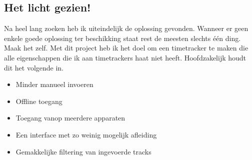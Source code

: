 \documentclass[a4paper,11pt]{article}
\begin{document}
\subsection{Het licht gezien!}
Na heel lang zoeken heb ik uiteindelijk de oplossing gevonden. Wanneer er geen
enkele goede oplossing ter beschikking staat rest de meesten slechts één ding.
Maak het zelf. Met dit project heb ik het doel om een timetracker te maken die
alle eigenschappen die ik aan timetrackers haat niet heeft. Hoofdzakelijk houdt
dit het volgende in.
\begin{itemize}
  \item Minder manueel invoeren
  \item Offline toegang
  \item Toegang vanop meerdere apparaten
  \item Een interface met zo weinig mogelijk afleiding
  \item Gemakkelijke filtering van ingevoerde tracks
\end{itemize}
\end{document}
